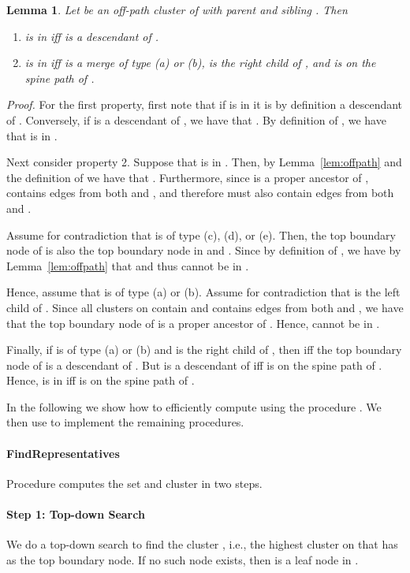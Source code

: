 \documentclass [11pt]{article}
\newtheorem{lemma}{Lemma}
\newenvironment{proof}{\noindent\emph{Proof. }}{}
\begin{document}
\begin{lemma}\label{lem:reprCluster}
Let  be an off-path  cluster of  with parent  and sibling . Then
\begin{enumerate}
\item  is in  iff  is a descendant of .
\item  is in  iff  is a merge of type (a) or (b),  is the right child of , and  is on the spine path of . 
\end{enumerate}
\end{lemma}
\begin{proof}
For the first property, first note that if  is in  it is by definition a descendant of . Conversely, if  is a descendant of , we have that . By definition of , we have that  is in . 

Next consider property 2. Suppose that  is in . Then, by Lemma~\ref{lem:offpath} and the definition of  we have that . Furthermore, since  is a proper ancestor of ,  contains edges from both  and , and therefore  must also contain edges from both  and . 

Assume for contradiction that  is of type (c), (d), or (e). Then, the top boundary node  of  is also the top boundary node in  and . Since  by definition of , we have by Lemma~\ref{lem:offpath} that  and thus  cannot be in . 

Hence, assume that  is of type (a) or (b). Assume for contradiction that  is the left child of . Since all clusters on  contain  and  contains edges from both  and , we have that the top boundary node of  is a proper ancestor of . Hence,  cannot be in . 

Finally, if  is of type (a) or (b) and is the right child of , then  iff the top boundary node  of  is a descendant of . But  is a descendant of  iff  is on the spine path of . Hence,  is in  iff  is on the spine path of .
\end{proof}
\medskip

\noindent In the following we show how to efficiently compute  using the procedure . We then use  to implement the remaining  procedures. 





\paragraph{FindRepresentatives}
Procedure  computes the set  and cluster  in two steps. 

\paragraph{Step 1: Top-down Search} We do a top-down search to find the cluster , i.e., the highest cluster on  that has  as the top boundary node. If no such node exists, then  is a leaf node in . 
\end{document}
